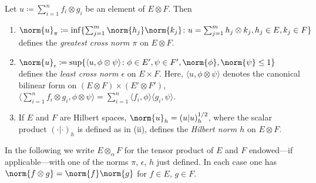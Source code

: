 Let $u \coloneqq \sum_{i=1}^{n} f_{i} \otimes g_{i}$ be an element of\/ $E \otimes F$. 
Then
\begin{enumerate}[\upshape(i), wide, labelindent=.25em]

\item
$\norm{u}_{\pi} \coloneqq \inf\{\sum_{j=1}^{m} \norm{h_{j}} \norm{k_{j}} \colon u = \sum_{j=1}^{m}h_{j} \otimes k_{j}, h_{j} \in E, k_{j} \in F\}$ defines the \emph{greatest cross norm $\pi$} on $E \otimes F$.

\item
$\norm{u}_{\epsilon} \coloneqq \sup\{\langle u,\phi \otimes \psi\rangle \colon \phi \in E', \psi \in F', \norm{\phi}, \norm{\psi} \leq 1\}$ defines the 
\emph{least cross norm $\epsilon$} on $E \times F$. 
Here, $\langle u,\phi \otimes \psi\rangle$ denotes the canonical bilinear form on $(E \otimes F) \times (E' \otimes F')$, \ie $\langle\sum_{i=1}^{n} f_{i} \otimes g_{i},\phi \otimes \psi\rangle = \sum_{i=1}^{n} \langle f_{i},\phi\rangle\langle g_{i},\psi\rangle$.

\item
If\/ $E$ and $F$ are Hilbert spaces, $\norm{u}_{h} = (u|u)_{h}^{1/2}$, where the scalar product $(\cdot|\cdot)_{h}$ is defined as in (ii), defines the \emph{Hilbert norm $h$} on $E \otimes F$.
\end{enumerate}
In the following we write $E \otimes_{\alpha} F$ for the tensor product of\/ $E$ and $F$ endowed---if applicable---with one of the norms $\pi$, $\epsilon$, $h$ just defined.
In each case one has $\norm{f \otimes g} = \norm{f} \norm{g}$ for $f \in E$, $g \in F$.

